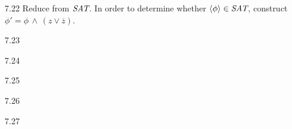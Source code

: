 \begin{itemize}
	\item[7.22]
	Reduce from $\textit{SAT}$. In order to determine whether $\langle {\phi} \rangle \in \textit{SAT}$, construct $\phi' = \phi \,\wedge\,(z \vee \overline{z})$.
	
	\item[7.23]
	\Omit
	
	\item[7.24]
	\Empty
	
	\item[7.25]
	\Empty
	
	\item[7.26]
	\Empty
	
	\item[7.27] 
	
\end{itemize}

